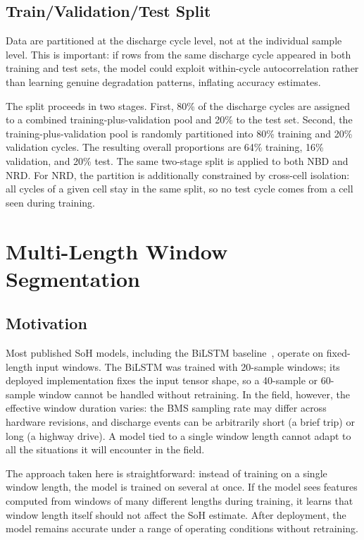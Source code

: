 \subsection{Train/Validation/Test Split}

Data are partitioned at the discharge cycle level, not at the individual sample level. This is important: if rows from the same discharge cycle appeared in both training and test sets, the model could exploit within-cycle autocorrelation rather than learning genuine degradation patterns, inflating accuracy estimates.

The split proceeds in two stages. First, 80\% of the discharge cycles are assigned to a combined training-plus-validation pool and 20\% to the test set. Second, the training-plus-validation pool is randomly partitioned into 80\% training and 20\% validation cycles. The resulting overall proportions are 64\% training, 16\% validation, and 20\% test. The same two-stage split is applied to both NBD and NRD. For NRD, the partition is additionally constrained by cross-cell isolation: all cycles of a given cell stay in the same split, so no test cycle comes from a cell seen during training.


\section{Multi-Length Window Segmentation}
\label{sec:ch3_segmentation}

\subsection{Motivation}

Most published SoH models, including the BiLSTM baseline~\autocite{Sammartino2021}, operate on fixed-length input windows. The BiLSTM was trained with 20-sample windows; its deployed implementation fixes the input tensor shape, so a 40-sample or 60-sample window cannot be handled without retraining. In the field, however, the effective window duration varies: the BMS sampling rate may differ across hardware revisions, and discharge events can be arbitrarily short (a brief trip) or long (a highway drive). A model tied to a single window length cannot adapt to all the situations it will encounter in the field.

The approach taken here is straightforward: instead of training on a single window length, the model is trained on several at once. If the model sees features computed from windows of many different lengths during training, it learns that window length itself should not affect the SoH estimate. After deployment, the model remains accurate under a range of operating conditions without retraining.

